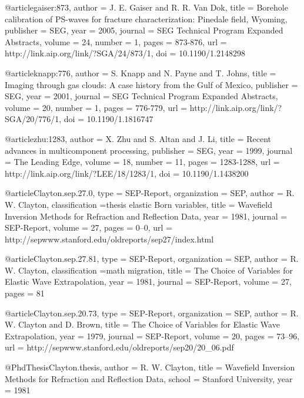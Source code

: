 @article{gaiser:873,
  author =	 {J. E. Gaiser and R. R. Van Dok},
  title =	 {Borehole calibration of PS-waves for fracture
                  characterization: Pinedale field, Wyoming},
  publisher =	 {SEG},
  year =	 2005,
  journal =	 {SEG Technical Program Expanded Abstracts},
  volume =	 24,
  number =	 1,
  pages =	 {873-876},
  url =		 {http://link.aip.org/link/?SGA/24/873/1},
  doi =		 {10.1190/1.2148298}
}

@article{knapp:776,
  author =	 {S. Knapp and N. Payne and T. Johns},
  title =	 {Imaging through gas clouds: A case history from the
                  Gulf of Mexico},
  publisher =	 {SEG},
  year =	 2001,
  journal =	 {SEG Technical Program Expanded Abstracts},
  volume =	 20,
  number =	 1,
  pages =	 {776-779},
  url =		 {http://link.aip.org/link/?SGA/20/776/1},
  doi =		 {10.1190/1.1816747}
}

@article{zhu:1283,
  author =	 {X. Zhu and S. Altan and J. Li},
  title =	 {Recent advances in multicomponent processing},
  publisher =	 {SEG},
  year =	 1999,
  journal =	 {The Leading Edge},
  volume =	 18,
  number =	 11,
  pages =	 {1283-1288},
  url =		 {http://link.aip.org/link/?LEE/18/1283/1},
  doi =		 {10.1190/1.1438200}
}

@article{Clayton.sep.27.0,
  type =	 {SEP-Report},
  organization = {SEP},
  author =	 {R. W. Clayton},
  classification ={thesis elastic {Born} variables},
  title =	 {Wavefield Inversion Methods for Refraction and
                  Reflection Data},
  year =	 1981,
  journal =	 {SEP-Report},
  volume =	 27,
  pages =	 {0--0},
  url =
                  {http://sepwww.stanford.edu/oldreports/sep27/index.html}
}

@article{Clayton.sep.27.81,
  type =	 {SEP-Report},
  organization = {SEP},
  author =	 {R. W. Clayton},
  classification ={math migration},
  title =	 {The Choice of Variables for Elastic Wave
                  Extrapolation},
  year =	 1981,
  journal =	 {SEP-Report},
  volume =	 27,
  pages =	 81
}

@article{Clayton.sep.20.73,
  type =	 {SEP-Report},
  organization = {SEP},
  author =	 {R. W. Clayton and D. Brown},
  title =	 {The Choice of Variables for Elastic Wave
                  Extrapolation},
  year =	 1979,
  journal =	 {SEP-Report},
  volume =	 20,
  pages =	 {73--96},
  url =
                  {http://sepwww.stanford.edu/oldreports/sep20/20_06.pdf}
}

@PhdThesis{Clayton.thesis,
  author =	 {R. W. Clayton},
  title =	 {Wavefield Inversion Methods for Refraction and
                  Reflection Data},
  school =	 {Stanford University},
  year =	 1981
}

